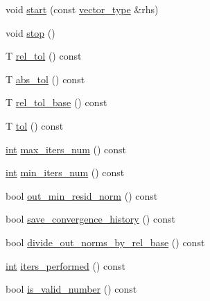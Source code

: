 \begin{DoxyCompactItemize}
\item 
void \hyperlink{classnumerical__algos_1_1lin__solvers_1_1default__monitor_ae1f0235658ea84218cfb29a312c6ffc0}{start} (const \hyperlink{classnumerical__algos_1_1lin__solvers_1_1default__monitor_afe4ad299b536cf5df8efbd2c08b619f5}{vector\-\_\-type} \&rhs)
\item 
void \hyperlink{classnumerical__algos_1_1lin__solvers_1_1default__monitor_a78ca19b3ecf48d67cb245af417fdb97a}{stop} ()
\item 
T \hyperlink{classnumerical__algos_1_1lin__solvers_1_1default__monitor_ada85d0e3f07a8a4ef176a8c6ca090329}{rel\-\_\-tol} () const 
\item 
T \hyperlink{classnumerical__algos_1_1lin__solvers_1_1default__monitor_a28c4268cf6cc7058a351083a6b6272d1}{abs\-\_\-tol} () const 
\item 
T \hyperlink{classnumerical__algos_1_1lin__solvers_1_1default__monitor_aef01dc1870d93ff92c604c6ff618b206}{rel\-\_\-tol\-\_\-base} () const 
\item 
T \hyperlink{classnumerical__algos_1_1lin__solvers_1_1default__monitor_aa554224a075325c4c537ade783a0e833}{tol} () const 
\item 
\hyperlink{classint}{int} \hyperlink{classnumerical__algos_1_1lin__solvers_1_1default__monitor_afcb878caf8bc1c3f816896df59689c78}{max\-\_\-iters\-\_\-num} () const 
\item 
\hyperlink{classint}{int} \hyperlink{classnumerical__algos_1_1lin__solvers_1_1default__monitor_a4cbfc2ff13dde5cff2d65267bb86398f}{min\-\_\-iters\-\_\-num} () const 
\item 
bool \hyperlink{classnumerical__algos_1_1lin__solvers_1_1default__monitor_a91011d0a20628ed3488009180dadd15c}{out\-\_\-min\-\_\-resid\-\_\-norm} () const 
\item 
bool \hyperlink{classnumerical__algos_1_1lin__solvers_1_1default__monitor_a397c2b87b68d1f24c24645c06b2550c8}{save\-\_\-convergence\-\_\-history} () const 
\item 
bool \hyperlink{classnumerical__algos_1_1lin__solvers_1_1default__monitor_a23c2f5d0d37b20c027dc6890ae649c2e}{divide\-\_\-out\-\_\-norms\-\_\-by\-\_\-rel\-\_\-base} () const 
\item 
\hyperlink{classint}{int} \hyperlink{classnumerical__algos_1_1lin__solvers_1_1default__monitor_aa6a060394887505a0490b03b36475483}{iters\-\_\-performed} () const 
\item 
bool \hyperlink{classnumerical__algos_1_1lin__solvers_1_1default__monitor_a94135959ebff236eef6e2b5d3e0fe29b}{is\-\_\-valid\-\_\-number} () const 

\end{DoxyCompactItemize}
